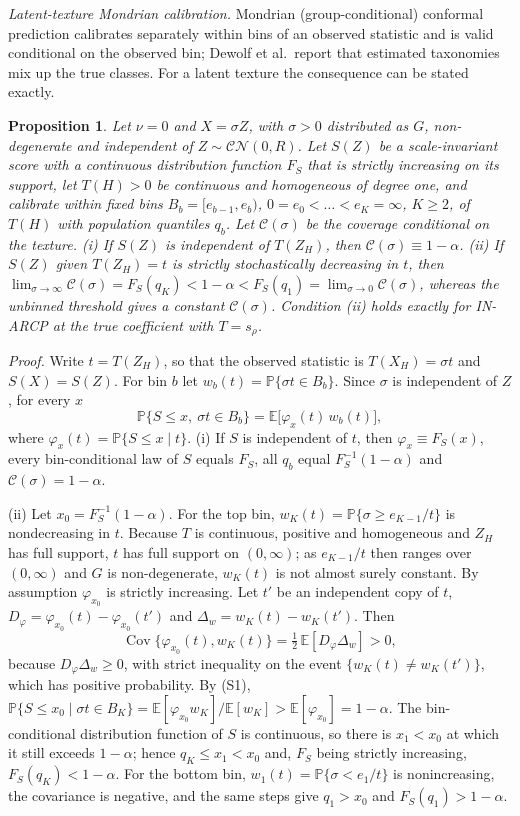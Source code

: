 \documentclass[10pt]{article}
\newtheorem{propS}{Proposition}
\begin{document}
\emph{Latent-texture Mondrian calibration.} Mondrian (group-conditional) conformal prediction calibrates separately within bins of an observed statistic and is valid conditional on the observed bin; Dewolf et al.\ report that estimated taxonomies mix up the true classes. For a latent texture the consequence can be stated exactly.
\begin{propS}\label{prop:mondrian}
Let $\nu=0$ and $X=\sigma Z$, with $\sigma>0$ distributed as $G$, non-degenerate and independent of $Z\sim\mathcal{CN}(0,R)$. Let $S(Z)$ be a scale-invariant score with a continuous distribution function $F_S$ that is strictly increasing on its support, let $T(H)>0$ be continuous and homogeneous of degree one, and calibrate within fixed bins $B_b=[e_{b-1},e_b)$, $0=e_0<\dots<e_K=\infty$, $K\ge2$, of $T(H)$ with population quantiles $q_b$. Let $\mathcal C(\sigma)$ be the coverage conditional on the texture.
(i) If $S(Z)$ is independent of $T(Z_H)$, then $\mathcal C(\sigma)\equiv1-\alpha$.
(ii) If $S(Z)$ given $T(Z_H)=t$ is strictly stochastically decreasing in $t$, then $\lim_{\sigma\to\infty}\mathcal C(\sigma)=F_S(q_K)<1-\alpha<F_S(q_1)=\lim_{\sigma\to0}\mathcal C(\sigma)$, whereas the unbinned threshold gives a constant $\mathcal C(\sigma)$. Condition (ii) holds exactly for IN-ARCP at the true coefficient with $T=s_\rho$.
\end{propS}
\emph{Proof.}
Write $t=T(Z_H)$, so that the observed statistic is $T(X_H)=\sigma t$ and $S(X)=S(Z)$. For bin $b$ let $w_b(t)=\mathbb{P}\{\sigma t\in B_b\}$. Since $\sigma$ is independent of $Z$, for every $x$
\begin{equation}
\mathbb{P}\{S\le x,\ \sigma t\in B_b\}=\mathbb E\big[\varphi_x(t)\,w_b(t)\big],
\tag{S1}
\end{equation}
where $\varphi_x(t)=\mathbb{P}\{S\le x\mid t\}$.
(i) If $S$ is independent of $t$, then $\varphi_x\equiv F_S(x)$, every bin-conditional law of $S$ equals $F_S$, all $q_b$ equal $F_S^{-1}(1-\alpha)$ and $\mathcal C(\sigma)=1-\alpha$.

(ii) Let $x_0=F_S^{-1}(1-\alpha)$. For the top bin, $w_K(t)=\mathbb{P}\{\sigma\ge e_{K-1}/t\}$ is nondecreasing in $t$. Because $T$ is continuous, positive and homogeneous and $Z_H$ has full support, $t$ has full support on $(0,\infty)$; as $e_{K-1}/t$ then ranges over $(0,\infty)$ and $G$ is non-degenerate, $w_K(t)$ is not almost surely constant. By assumption $\varphi_{x_0}$ is strictly increasing. Let $t'$ be an independent copy of $t$, $D_\varphi=\varphi_{x_0}(t)-\varphi_{x_0}(t')$ and $\Delta_w=w_K(t)-w_K(t')$. Then
\[
\operatorname{Cov}\{\varphi_{x_0}(t),w_K(t)\}=\tfrac12\,\mathbb E[D_\varphi\Delta_w]>0,
\]
because $D_\varphi\Delta_w\ge0$, with strict inequality on the event $\{w_K(t)\ne w_K(t')\}$, which has positive probability. By (S1),
$\mathbb{P}\{S\le x_0\mid\sigma t\in B_K\}=\mathbb E[\varphi_{x_0}w_K]/\mathbb E[w_K]>\mathbb E[\varphi_{x_0}]=1-\alpha$.
The bin-conditional distribution function of $S$ is continuous, so there is $x_1<x_0$ at which it still exceeds $1-\alpha$; hence $q_K\le x_1<x_0$ and, $F_S$ being strictly increasing, $F_S(q_K)<1-\alpha$. For the bottom bin, $w_1(t)=\mathbb{P}\{\sigma<e_1/t\}$ is nonincreasing, the covariance is negative, and the same steps give $q_1>x_0$ and $F_S(q_1)>1-\alpha$.
\end{document}
